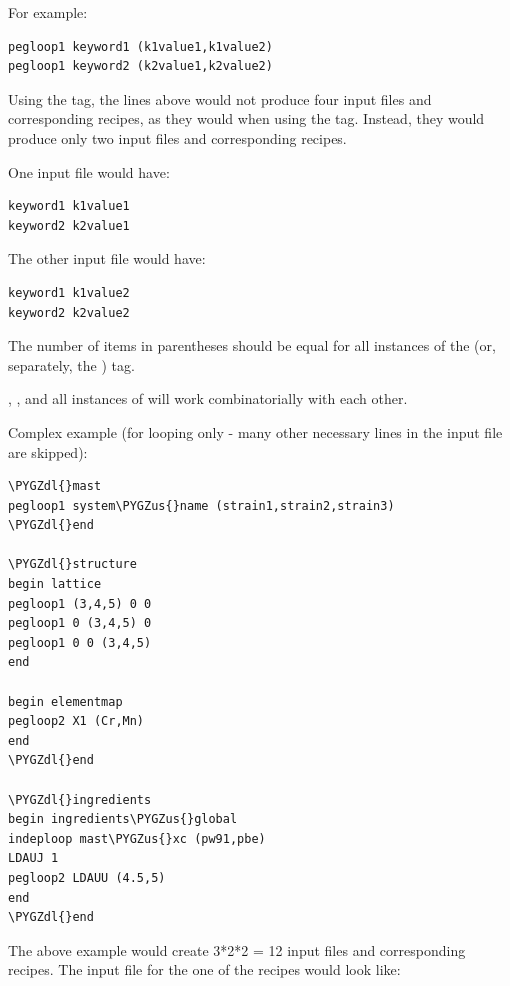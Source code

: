 \documentclass[letterpaper,10pt,english]{sphinxmanual}
\def\PYGZus{\char`\_}
\def\PYGZdl{\char`\$}
\begin{document}
For example:

\begin{Verbatim}[commandchars=\\\{\}]
pegloop1 keyword1 (k1value1,k1value2)
pegloop1 keyword2 (k2value1,k2value2)
\end{Verbatim}

Using the  tag, the lines above would not produce four input files and corresponding recipes, as they would when using the  tag. Instead, they would produce only two input files and corresponding recipes.

One input file would have:

\begin{Verbatim}[commandchars=\\\{\}]
keyword1 k1value1
keyword2 k2value1
\end{Verbatim}

The other input file would have:

\begin{Verbatim}[commandchars=\\\{\}]
keyword1 k1value2
keyword2 k2value2
\end{Verbatim}

The number of items in parentheses should be equal for all instances of the  (or, separately, the ) tag.

, , and all instances of  will work combinatorially with each other.

Complex example (for looping only - many other necessary lines in the input file are skipped):

\begin{Verbatim}[commandchars=\\\{\}]
\PYGZdl{}mast
pegloop1 system\PYGZus{}name (strain1,strain2,strain3)
\PYGZdl{}end

\PYGZdl{}structure
begin lattice
pegloop1 (3,4,5) 0 0
pegloop1 0 (3,4,5) 0
pegloop1 0 0 (3,4,5)
end

begin elementmap
pegloop2 X1 (Cr,Mn)
end
\PYGZdl{}end

\PYGZdl{}ingredients
begin ingredients\PYGZus{}global
indeploop mast\PYGZus{}xc (pw91,pbe)
LDAUJ 1
pegloop2 LDAUU (4.5,5)
end
\PYGZdl{}end
\end{Verbatim}

The above example would create 3*2*2 = 12 input files and corresponding recipes. The input file for the one of the recipes would look like:
\end{document}
